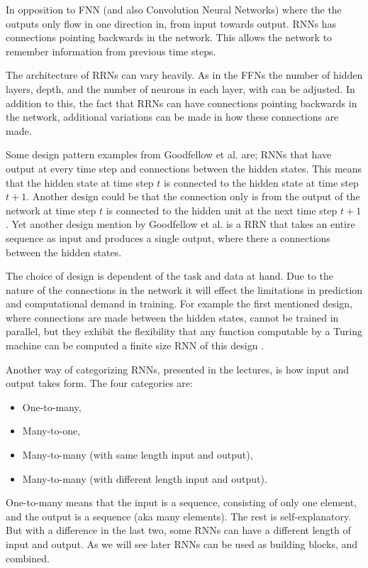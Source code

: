 In opposition to FNN (and also Convolution Neural Networks) where the the outputs only
flow in one direction in, from input towards output. RNNs has connections pointing backwards in the network.
This allows the network to remember information from previous time steps.

The architecture of RRNs can vary heavily. As in the FFNs the number of hidden layers, depth, and 
the number of neurons in each layer, with can be adjusted. In addition to this,
the fact that RRNs can have connections pointing backwards in the network,
additional variations can be made in how these connections are made.

Some design pattern examples from Goodfellow et al. \cite{Goodfellow-et-al-2016} are;
RNNs that have output at every time step and connections between the hidden states.
This means that the hidden state at time step $t$ is connected to the hidden state at time step $t+1$.
Another design could be that the connection only is from the output of the network at time step $t$
is connected to the hidden unit at the next time step $t+1$.
Yet another design mention by Goodfellow et al. is a RRN that takes an entire sequence
as input and produces a single output, where there a connections between the hidden states.

The choice of design is dependent of the task and data at hand. Due to the nature of
the connections in the network it will effect the limitations in prediction and computational demand
in training. For example the first mentioned design, where connections are made between the hidden states,
cannot be trained in parallel, but they exhibit the flexibility that any 
function computable by a Turing machine can be computed a finite size RNN of this design \cite{Goodfellow-et-al-2016}.

Another way of categorizing RNNs, presented in the lectures, is how input and 
output takes form. The four categories are:
\begin{itemize}
    \item One-to-many,
    \item Many-to-one,
    \item Many-to-many (with same length input and output),
    \item Many-to-many (with different length input and output).
\end{itemize}
One-to-many means that the input is a sequence, consisting of only one element,
and the output is a sequence (aka many elements). The rest is self-explanatory. But with a difference in the last two,
some RNNs can have a different length of input and output. As we will see later
RNNs can be used as building blocks, and combined.
\newline

